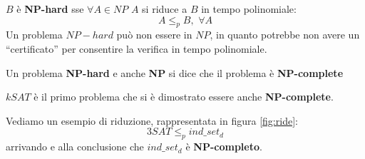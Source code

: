						\begin{definizione}
							$B$ è \textbf{NP-hard} sse $\forall A\in NP$ $A$ si riduce a $B$ in tempo
							polinomiale:
							\[A\leq_p B,\,\,\forall A\]
							Un problema $NP-hard$ può non essere in $NP$, in quanto potrebbe non avere un
							``certificato'' per consentire la verifica in tempo polinomiale.
						\end{definizione}
						\begin{definizione}
							Un problema \textbf{NP-hard} e anche \textbf{NP} si dice che il problema è
							\textbf{NP-complete} 
						\end{definizione}
						$kSAT$ è il primo problema che si è dimostrato essere anche
						\textbf{NP-complete}.
						\begin{esempio}
							Vediamo un esempio di riduzione, rappresentata in figura \ref{fig:ride}:
							\[3SAT\leq_p ind\_set_d\]
							arrivando e alla conclusione che $ind\_set_d$ è \textbf{NP-completo}.\\
							\begin{figure}
								\centering
																    

\end{figure}
\end{esempio}
